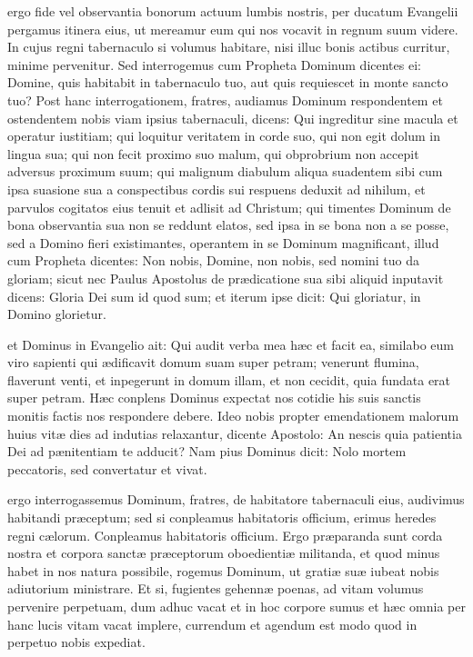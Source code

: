 \documentclass[fontsize=9pt,paper=A6,twoside,BCOR=1mm,DIV=22,headinclude]{scrarticle}
\begin{document}
\begin{multicols}{2}

 ergo fide vel observantia bonorum actuum lumbis nostris, per ducatum Evangelii pergamus itinera eius, ut mereamur eum qui nos vocavit in regnum suum videre. In cujus regni tabernaculo si volumus habitare, nisi illuc bonis actibus curritur, minime pervenitur. Sed interrogemus cum Propheta Dominum dicentes ei: Domine, quis habitabit in tabernaculo tuo, aut quis requiescet in monte sancto tuo? Post hanc interrogationem, fratres, audiamus Dominum respondentem et ostendentem nobis viam ipsius tabernaculi, dicens: Qui ingreditur sine macula et operatur iustitiam; qui loquitur veritatem in corde suo, qui non egit dolum in lingua sua; qui non fecit proximo suo malum, qui obprobrium non accepit adversus proximum suum; qui malignum diabulum aliqua suadentem sibi cum ipsa suasione sua a conspectibus cordis sui respuens deduxit ad nihilum, et parvulos cogitatos eius tenuit et adlisit ad Christum; qui timentes Dominum de bona observantia sua non se reddunt elatos, sed ipsa in se bona non a se posse, sed a Domino fieri existimantes, operantem in se Dominum magnificant, illud cum Propheta dicentes: Non nobis, Domine, non nobis, sed nomini tuo da gloriam; sicut nec Paulus Apostolus de prædicatione sua sibi aliquid inputavit dicens: Gloria Dei sum id quod sum; et iterum ipse dicit: Qui gloriatur, in Domino glorietur.


 et Dominus in Evangelio ait: Qui audit verba mea hæc et facit ea, similabo eum viro sapienti qui ædificavit domum suam super petram; venerunt flumina, flaverunt venti, et inpegerunt in domum illam, et non cecidit, quia fundata erat super petram. Hæc conplens Dominus expectat nos cotidie his suis sanctis monitis factis nos respondere debere. Ideo nobis propter emendationem malorum huius vitæ dies ad indutias relaxantur, dicente Apostolo: An nescis quia patientia Dei ad pænitentiam te adducit? Nam pius Dominus dicit: Nolo mortem peccatoris, sed convertatur et vivat.


 ergo interrogassemus Dominum, fratres, de habitatore tabernaculi eius, audivimus habitandi præceptum; sed si conpleamus habitatoris officium, erimus heredes regni cælorum. Conpleamus habitatoris officium. Ergo præparanda sunt corda nostra et corpora sanctæ præceptorum oboedientiæ militanda, et quod minus habet in nos natura possibile, rogemus Dominum, ut gratiæ suæ iubeat nobis adiutorium ministrare. Et si, fugientes gehennæ poenas, ad vitam volumus pervenire perpetuam, dum adhuc vacat et in hoc corpore sumus et hæc omnia per hanc lucis vitam vacat implere, currendum et agendum est modo quod in perpetuo nobis expediat.


\end{multicols}
\end{document}
